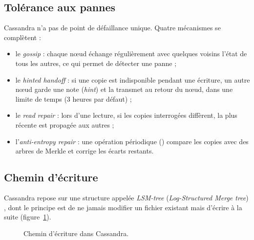 \documentclass[11pt,a4paper]{article}
\newcommand{\cq}[1]{\texttt{\detokenize{#1}}}
\begin{document}
\subsection{Tolérance aux pannes}
Cassandra n'a pas de point de défaillance unique. Quatre mécanismes se complètent :
\begin{itemize}
  \item le \emph{gossip} : chaque nœud échange régulièrement avec quelques voisins l'état de tous les autres, ce qui permet de détecter une panne ;
  \item le \emph{hinted handoff} : si une copie est indisponible pendant une écriture, un autre nœud garde une note (\emph{hint}) et la transmet au retour du nœud, dans une limite de temps (3 heures par défaut) ;
  \item le \emph{read repair} : lors d'une lecture, si les copies interrogées diffèrent, la plus récente est propagée aux autres ;
  \item l'\emph{anti-entropy repair} : une opération périodique (\cq{nodetool repair}) compare les copies avec des arbres de Merkle et corrige les écarts restants.
\end{itemize}

\subsection{Chemin d'écriture}
Cassandra repose sur une structure appelée \emph{LSM-tree} (\emph{Log-Structured Merge tree}) \cite{lsm}, dont le principe est de ne jamais modifier un fichier existant mais d'écrire à la suite (figure~\ref{fig:write}).

\begin{figure}[ht]
\centering
{}
\caption{Chemin d'écriture dans Cassandra.}
\label{fig:write}
\end{figure}
\end{document}
